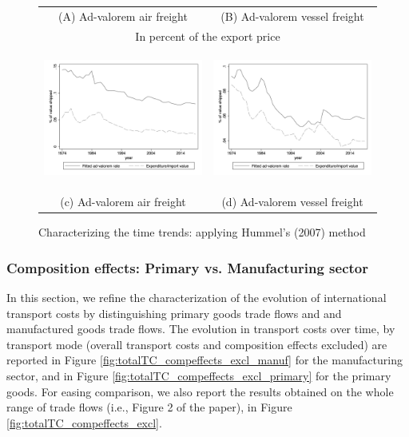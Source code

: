 \documentclass[11pt,twoside, authoryear]{elsarticle}
\begin{document}
\begin{figure}[htbp]
\caption{Characterizing the time trends: applying Hummel's (2007) method }
\label{fig:comp_effects_as_in_Hummels}
\begin{center}
\begin{tabular}{cc}
{\small (A) Ad-valorem air freight} & {\small (B) Ad-valorem vessel freight}\\
\multicolumn{2}{c}{{\small In percent of the export price}} \\
\includegraphics[width=2.5in, height=1.8in]{figure5_comme_hummels.jpg}
& \includegraphics[width=2.5in,height=1.8in]{figure6_comme_hummels.jpg} \\
{\small (c) Ad-valorem air freight} & {\small (d) Ad-valorem vessel freight} \\
\end{tabular}
\end{center}
\end{figure}

\subsubsection{Composition effects: Primary vs. Manufacturing sector}
In this section, we refine the characterization of the evolution of international transport costs by distinguishing primary goods trade flows and and manufactured goods trade flows. The evolution in transport costs over time, by transport mode (overall transport costs and composition effects excluded) are reported in Figure \ref{fig:totalTC_compeffects_excl_manuf} for the manufacturing sector, and in Figure \ref{fig:totalTC_compeffects_excl_primary} for the primary goods. For easing comparison, we also report the results obtained on the whole range of trade flows (i.e., Figure 2 of the paper), in Figure \ref{fig:totalTC_compeffects_excl}.
\end{document}
